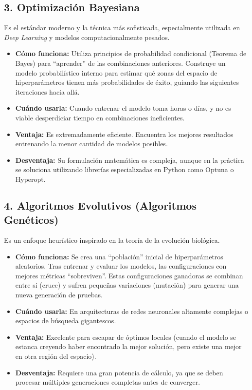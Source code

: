 \subsection{3. Optimización Bayesiana}
Es el estándar moderno y la técnica más sofisticada, especialmente utilizada en \textit{Deep Learning} y modelos computacionalmente pesados.

\begin{itemize}
    \item \textbf{Cómo funciona:} Utiliza principios de probabilidad condicional (Teorema de Bayes) para ``aprender'' de las combinaciones anteriores. Construye un modelo probabilístico interno para estimar qué zonas del espacio de hiperparámetros tienen más probabilidades de éxito, guiando las siguientes iteraciones hacia allá.
    \item \textbf{Cuándo usarla:} Cuando entrenar el modelo toma horas o días, y no es viable desperdiciar tiempo en combinaciones ineficientes.
    \item \textbf{Ventaja:} Es extremadamente eficiente. Encuentra los mejores resultados entrenando la menor cantidad de modelos posibles.
    \item \textbf{Desventaja:} Su formulación matemática es compleja, aunque en la práctica se soluciona utilizando librerías especializadas en Python como Optuna o Hyperopt.
\end{itemize}

\subsection{4. Algoritmos Evolutivos (Algoritmos Genéticos)}
Es un enfoque heurístico inspirado en la teoría de la evolución biológica.

\begin{itemize}
    \item \textbf{Cómo funciona:} Se crea una ``población'' inicial de hiperparámetros aleatorios. Tras entrenar y evaluar los modelos, las configuraciones con mejores métricas ``sobreviven''. Estas configuraciones ganadoras se combinan entre sí (cruce) y sufren pequeñas variaciones (mutación) para generar una nueva generación de pruebas.
    \item \textbf{Cuándo usarla:} En arquitecturas de redes neuronales altamente complejas o espacios de búsqueda gigantescos.
    \item \textbf{Ventaja:} Excelente para escapar de óptimos locales (cuando el modelo se estanca creyendo haber encontrado la mejor solución, pero existe una mejor en otra región del espacio).
    \item \textbf{Desventaja:} Requiere una gran potencia de cálculo, ya que se deben procesar múltiples generaciones completas antes de converger.
\end{itemize}

